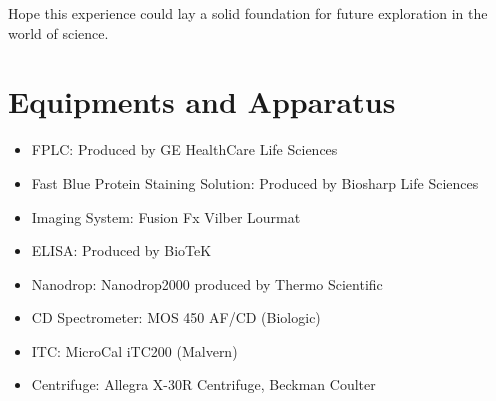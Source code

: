 \documentclass{report}
\begin{document}
Hope this experience could lay a solid foundation for future exploration in the world of science.


\appendix
\chapter{Equipments and Apparatus}
\begin{itemize}
    \item FPLC: Produced by GE HealthCare Life Sciences
    \item Fast Blue Protein Staining Solution: Produced by Biosharp Life Sciences
    \item Imaging System: Fusion Fx Vilber Lourmat
    \item ELISA: Produced by BioTeK
    \item Nanodrop: Nanodrop2000 produced by Thermo Scientific
    \item CD Spectrometer: MOS 450 AF/CD (Biologic)
    \item ITC: MicroCal iTC200 (Malvern)
    \item Centrifuge: Allegra X-30R Centrifuge, Beckman Coulter

\end{itemize}


\end{document}
